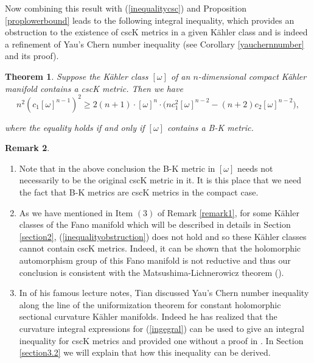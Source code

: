 \documentclass[11pt]{amsart}
\newtheorem{theorem}{Theorem}[section]
\theoremstyle{definition}
\newtheorem{remark}[theorem]{Remark}
\theoremstyle{remark}
\numberwithin{equation}{section}
\begin{document}
Now combining this result with (\ref{inequalitycsc}) and Proposition
\ref{proplowerbound} leads to the following integral inequality,
which provides an obstruction to the existence of cscK metrics in a
given K\"{a}hler class and is indeed a refinement of Yau's Chern
number inequality (see Corollary \ref{yauchernnumber} and its
proof).

\begin{theorem}\label{theorem}
Suppose the K\"{a}hler class $[\omega]$ of an $n$-dimensional
compact K\"{a}hler manifold contains a cscK metric. Then we have
\begin{equation}\label{inequalityobstruction} n^2(c_1[\omega]^{n-1})^2\geq
2(n+1)\cdot[\omega]^n\cdot\big(nc_1^2[\omega]^{n-2}-(n+2)c_2[\omega]^{n-2}\big),\end{equation}

where the equality holds if and only if $[\omega]$ contains a B-K
metric.
\end{theorem}

\begin{remark}\label{remark2}~
\begin{enumerate}
\item
Note that in the above conclusion the B-K metric in $[\omega]$ needs
not necessarily to be the original cscK metric in it. It is this
place that we need the fact that B-K metrics are cscK metrics in the
compact case.

\item
As we have mentioned in Item $(3)$ of Remark \ref{remark1}, for some
K\"{a}hler classes of the Fano manifold which will be described in
details in Section \ref{section2}, (\ref{inequalityobstruction})
does not hold and so these K\"{a}hler classes cannot contain cscK
metrics. Indeed, it can be shown that the holomorphic automorphism
group of this Fano manifold is not reductive and thus our conclusion
is consistent with the Matsushima-Lichnerowicz theorem (\cite{ML}).

\item
In \cite[\S 2.3]{Ti} of his famous lecture notes, Tian discussed
Yau's Chern number inequality along the line of the uniformization
theorem for constant holomorphic sectional curvature K\"{a}hler
manifolds. Indeed he has realized that the curvature integral
expressions for (\ref{ingegral}) can be used to give an integral
inequality for cscK metrics and provided one without a proof in
\cite[p. 21, Remark 2.15]{Ti}. In Section \ref{section3.2} we will
explain that how this inequality can be derived.
\end{enumerate}
\end{remark}
\end{document}
